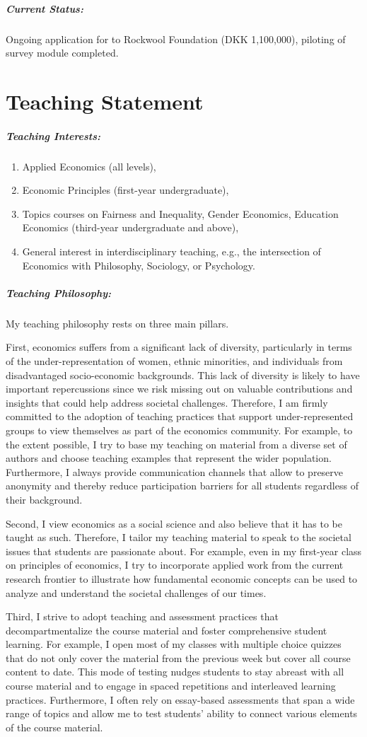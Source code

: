 \documentclass[11pt, a4paper]{article}
\begin{document}
\subparagraph{Current Status:} Ongoing application for to Rockwool Foundation (DKK 1,100,000), piloting of survey module completed.

\section*{Teaching Statement}

\subparagraph{Teaching Interests:} 
\begin{enumerate}
\item Applied Economics (all levels),
\item Economic Principles (first-year undergraduate),
\item Topics courses on Fairness and Inequality, Gender Economics, Education Economics (third-year undergraduate and above),
\item General interest in interdisciplinary teaching, e.g., the intersection of Economics with Philosophy, Sociology, or Psychology.
\end{enumerate}

\subparagraph{Teaching Philosophy:}
My teaching philosophy rests on three main pillars. 

First, economics suffers from a significant lack of diversity, particularly in terms of the under-representation of women, ethnic minorities, and individuals from disadvantaged socio-economic backgrounds. This lack of diversity is likely to have important repercussions since we risk missing out on valuable contributions and insights that could help address societal challenges. Therefore, I am firmly committed to the adoption of teaching practices that support under-represented groups to view themselves as part of the economics community. For example, to the extent possible, I try to base my teaching on material from a diverse set of authors and choose teaching examples that represent the wider population. Furthermore, I always provide communication channels that allow to preserve anonymity and thereby reduce participation barriers for all students regardless of their background.

Second, I view economics as a social science and also believe that it has to be taught as such. Therefore, I tailor my teaching material to speak to the societal issues that students are passionate about. For example, even in my first-year class on principles of economics, I try to incorporate applied work from the current research frontier to illustrate how fundamental economic concepts can be used to analyze and understand the societal challenges of our times.


Third, I strive to adopt teaching and assessment practices that decompartmentalize the course material and foster comprehensive student learning. For example, I open most of my classes with multiple choice quizzes that do not only cover the material from the previous week but cover all course content to date. This mode of testing nudges students to stay abreast with all course material and to engage in spaced repetitions and interleaved learning practices. Furthermore, I often rely on essay-based assessments that span a wide range of topics and allow me to test students' ability to connect various elements of the course material. 
\end{document}
